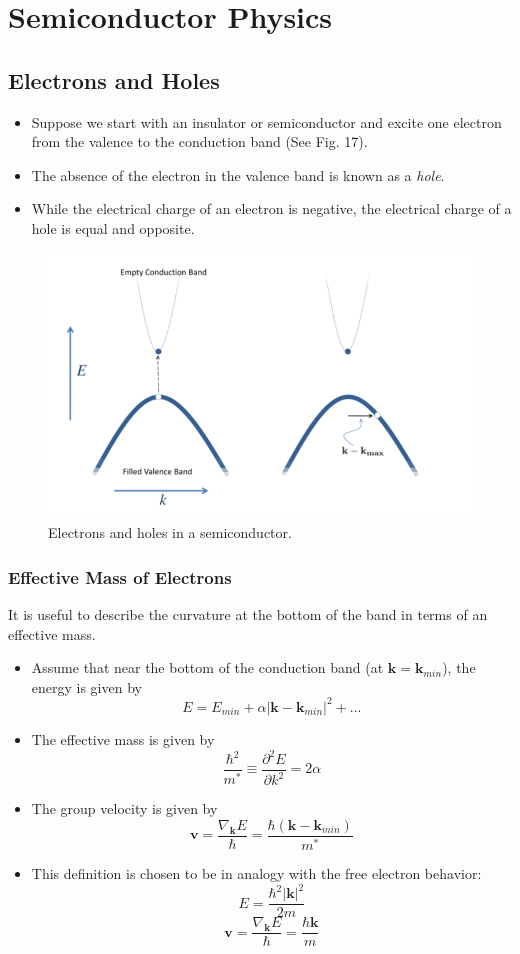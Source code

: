 \documentclass[10pt]{article}
\begin{document}
\section{Semiconductor Physics}
\subsection{Electrons and Holes}
\begin{itemize}
  \item Suppose we start with an insulator or semiconductor and excite one electron from the valence to the conduction band (See Fig. 17).
  \item The absence of the electron in the valence band is known as a \emph{hole}.
  \item While the electrical charge of an electron is negative, the electrical charge of a hole is equal and opposite.
\end{itemize}

\begin{figure}
  \centering
    \includegraphics[width=\textwidth]{tb17}
    \caption{Electrons and holes in a semiconductor.}
\end{figure}

\subsubsection{Effective Mass of Electrons}
It is useful to describe the curvature at the bottom of the band in terms of an effective mass.
\begin{itemize}
  \item Assume that near the bottom of the conduction band (at $\textbf{k} = \textbf{k}_{min}$), the energy is given by
  $$
  E = E_{min} + \alpha|\textbf{k} - \textbf{k}_{min}|^{2} + ...
  $$
  \item The effective mass is given by
  $$
  \frac{\hbar^{2}}{m^{*}} \equiv \frac{\partial^{2}E}{\partial k^{2}} = 2\alpha
  $$
  \item The group velocity is given by
  $$\textbf{v} = \frac{\nabla_{\textbf{k}}E}{\hbar} = \frac{\hbar(\textbf{k}-\textbf{k}_{min })}{m^{*}}$$
  \item This definition is chosen to be in analogy with the free electron behavior:
  $$
    E = \frac{\hbar^{2}|\textbf{k}|^{2}}{2m}
  $$
  $$
  \textbf{v} = \frac{\nabla_{\textbf{k}}E}{\hbar} = \frac{\hbar \textbf{k}}{m}
  $$
\end{itemize}
\end{document}
